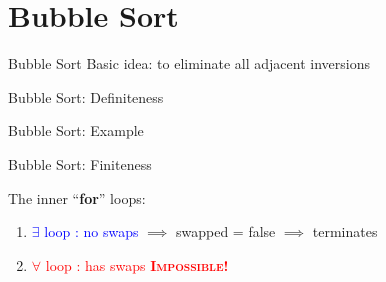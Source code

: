 \section{Bubble Sort}

\begin{frame}{Bubble Sort}
  Basic idea: to eliminate all adjacent inversions
  \pause

  
\end{frame}
\begin{frame}{Bubble Sort: Definiteness}
  
\end{frame}
\begin{frame}{Bubble Sort: Example}

  \begin{center}
	
  \end{center}

\end{frame}
\begin{frame}{Bubble Sort: Finiteness}
  \begin{center}
  \end{center}

  The inner ``{\bf for}'' loops:
  \begin{enumerate}[1)]
	\item \textcolor{blue}{$\exists$ loop : no swaps} $\implies$ swapped = false $\implies$ terminates
	  \pause
	\item \textcolor{red}{$\forall$ loop : has swaps} \pause \qquad \textcolor{red}{\bf \textsc{Impossible}!}
  \end{enumerate}
\end{frame}
